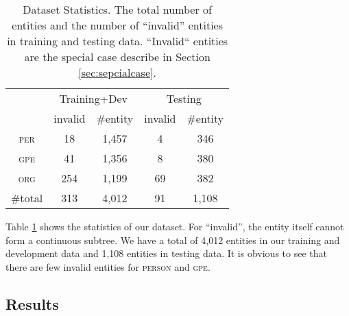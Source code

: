 \begin{table}[h]
	\centering
	\begin{tabular}{ccccc}
		\toprule
		& \multicolumn{2}{c}{Training+Dev} & \multicolumn{2}{c}{Testing}\\ 
		& invalid & \#entity  &  invalid & \#entity  \\
		\midrule
		\textsc{per} & 18 & 1,457 & 4   & 346\\ 
		\textsc{gpe} & 41   & 1,356 & 8  & 380\\ 
		\textsc{org} & 254  & 1,199 & 69  & 382\\ 
		\#total & 313  & 4,012 & 91& 1,108\\ 
		\bottomrule
	\end{tabular}
	\caption{Dataset Statistics. The total number of entities and the number of ``invalid'' entities in training and testing data. ``Invalid`` entities are the special case describe in Section \ref{sec:sepcialcase}.}
	\label{tab:jointstatistics}
\end{table}
Table \ref{tab:jointstatistics} shows the statistics of our dataset. For ``invalid'', the entity itself cannot form a continuous subtree.
We have a total of 4,012 entities in our training and development data and 1,108 entities in testing data. 
It is obvious to see that there are few invalid entities for \textsc{person} and \textsc{gpe}. 

\subsection{Results}

